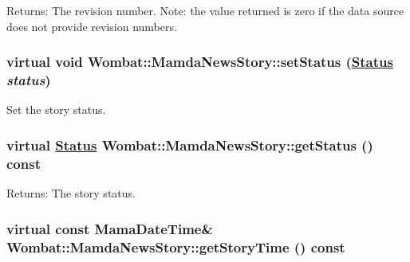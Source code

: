 \begin{Desc}
\item[Returns:]The revision number. Note: the value returned is zero if the data source does not provide revision numbers. \end{Desc}
\hypertarget{classWombat_1_1MamdaNewsStory_7c13140bbd6ccacd7ef94dcd657ca07b}{
\subsubsection[setStatus]{\setlength{\rightskip}{0pt plus 5cm}virtual void Wombat::Mamda\-News\-Story::set\-Status (\hyperlink{classWombat_1_1MamdaNewsStory_25ee81ce6b01be03a95ab954acdb1e6d}{Status} {\em status})}}
\label{classWombat_1_1MamdaNewsStory_7c13140bbd6ccacd7ef94dcd657ca07b}


Set the story status. 

\hypertarget{classWombat_1_1MamdaNewsStory_e8ae79512f3fbf9328f5a8a71db10aba}{
\subsubsection[getStatus]{\setlength{\rightskip}{0pt plus 5cm}virtual \hyperlink{classWombat_1_1MamdaNewsStory_25ee81ce6b01be03a95ab954acdb1e6d}{Status} Wombat::Mamda\-News\-Story::get\-Status () const}}
\label{classWombat_1_1MamdaNewsStory_e8ae79512f3fbf9328f5a8a71db10aba}


\begin{Desc}
\item[Returns:]The story status. \end{Desc}
\hypertarget{classWombat_1_1MamdaNewsStory_43d2330b3a2719ff048c789c5dae5023}{
\subsubsection[getStoryTime]{\setlength{\rightskip}{0pt plus 5cm}virtual const Mama\-Date\-Time\& Wombat::Mamda\-News\-Story::get\-Story\-Time () const}}
\label{classWombat_1_1MamdaNewsStory_43d2330b3a2719ff048c789c5dae5023}


